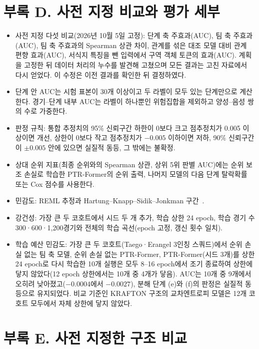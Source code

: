 \section*{부록 D. 사전 지정 비교와 평가 세부}
\begin{itemize}
\item 사전 지정 다섯 비교(2026년 10월 5일 고정): 단계 축 주효과(AUC), 팀 축 주효과(AUC), 팀 축 주효과의 Spearman 상관 차이, 관계를 섞은 대조 모델 대비 관계 편향 효과(AUC), 서식지 특징을 뺀 입력에서 구역 객체 토큰의 효과(AUC). 계획을 고정한 뒤 데이터 처리의 누수를 발견해 고쳤으며 모든 결과는 고친 자료에서 다시 얻었다. 이 수정은 이전 결과를 확인한 뒤 결정하였다.
\item 단계 안 AUC는 시험 표본이 30개 이상이고 두 라벨이 모두 있는 단계만으로 계산한다. 경기--단계 내부 AUC는 라벨이 하나뿐인 위험집합을 제외하고 양성--음성 쌍의 수로 가중한다.
\item 판정 규칙: 통합 추정치의 95\% 신뢰구간 하한이 0보다 크고 점추정치가 0.005 이상이면 개선, 상한이 0보다 작고 점추정치가 $-0.005$ 이하이면 저하, 90\% 신뢰구간이 $\pm0.005$ 안에 있으면 실질적 동등, 그 밖에는 불확정.
\item 상대 순위 지표(최종 순위와의 Spearman 상관, 상위 5위 판별 AUC)에는 순위 보조 손실로 학습한 PTR-Former의 순위 출력, 나머지 모델의 다음 단계 탈락확률 또는 Cox 점수를 사용한다.
\item 민감도: REML 추정과 Hartung--Knapp--Sidik--Jonkman 구간~\cite{SidikJonkman02}.
\item 강건성: 가장 큰 두 코호트에서 시드 두 개 추가, 학습 상한 24 epoch, 학습 경기 수 300·600·1,200경기와 전체의 학습 곡선(epoch 고정, 갱신 횟수 일치).
\item 학습 예산 민감도: 가장 큰 두 코호트(Taego·Erangel 3인칭 스쿼드)에서 순위 손실 없는 팀 축 모델, 순위 손실 없는 PTR-Former, PTR-Former(시드 3개)를 상한 24 epoch로 다시 학습한 10개 실행은 모두 8--16 epoch에서 조기 종료하여 상한에 닿지 않았다(12 epoch 상한에서는 10개 중 4개가 닿음). AUC는 10개 중 9개에서 오히려 낮아졌고($-0.0004$에서 $-0.0027$), 분해 단계 (e)와 (f)의 판정은 실질적 동등으로 유지되었다. 비교 기준인 KRAFTON 구조의 교차엔트로피 모델은 12개 코호트 모두에서 자체 상한에 닿지 않았다.
\end{itemize}

\section*{부록 E. 사전 지정한 구조 비교}
\noindent{}

